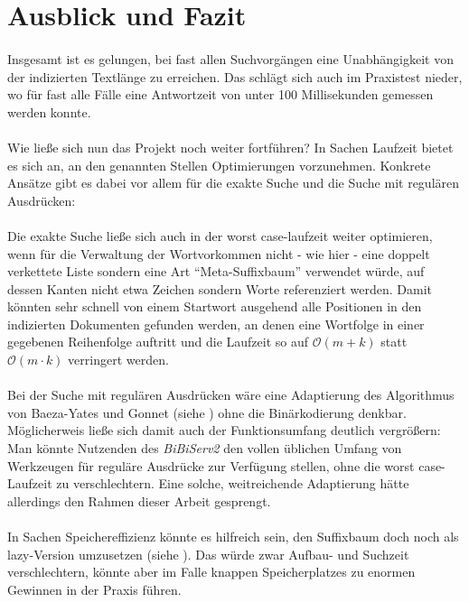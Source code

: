 \newpage

\section{Ausblick und Fazit}
\label{fazit-ausblick}

\paragraph{} Insgesamt ist es gelungen, bei fast allen Suchvorgängen eine Unabhängigkeit von der indizierten Textlänge zu erreichen. Das schlägt sich auch im Praxistest nieder, wo für fast alle Fälle eine Antwortzeit von unter 100 Millisekunden gemessen werden konnte.
\paragraph{} Wie ließe sich nun das Projekt noch weiter fortführen? In Sachen Laufzeit bietet es sich an, an den genannten Stellen Optimierungen vorzunehmen. Konkrete Ansätze gibt es dabei vor allem für die exakte Suche und die Suche mit regulären Ausdrücken:
\paragraph{} Die exakte Suche ließe sich auch in der worst case-laufzeit weiter optimieren, wenn für die Verwaltung der Wortvorkommen nicht - wie hier - eine doppelt verkettete Liste sondern eine Art "`Meta-Suffixbaum"' verwendet würde, auf dessen Kanten nicht etwa Zeichen sondern Worte referenziert werden. Damit könnten sehr schnell von einem Startwort ausgehend alle Positionen in den indizierten Dokumenten gefunden werden, an denen eine Wortfolge in einer gegebenen Reihenfolge auftritt und die Laufzeit so auf $\mathcal{O}(m+k)$ statt $\mathcal{O}(m \cdot k)$ verringert werden.
\paragraph{} Bei der Suche mit regulären Ausdrücken wäre eine Adaptierung des Algorithmus von Baeza-Yates und Gonnet (siehe \cite{baeza-yates}) ohne die Binärkodierung denkbar. Möglicherweis ließe sich damit auch der Funktionsumfang deutlich vergrößern: Man könnte Nutzenden des \textit{BiBiServ2} den vollen üblichen Umfang von Werkzeugen für reguläre Ausdrücke zur Verfügung stellen, ohne die worst case-Laufzeit zu verschlechtern. Eine solche, weitreichende Adaptierung hätte allerdings den Rahmen dieser Arbeit gesprengt.
\paragraph{} In Sachen Speichereffizienz könnte es hilfreich sein, den Suffixbaum doch noch als lazy-Version umzusetzen (siehe \cite{lazyTrees}). Das würde zwar Aufbau- und Suchzeit verschlechtern, könnte aber im Falle knappen Speicherplatzes zu enormen Gewinnen in der Praxis führen.
